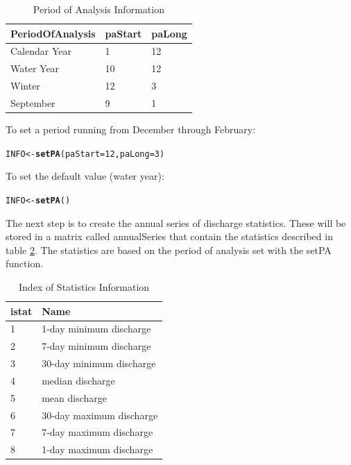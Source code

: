 \documentclass[a4paper,11pt]{article}\usepackage[]{graphicx}\usepackage[]{color}
\makeatletter
\newcommand{\hlnum}[1]{\textcolor[rgb]{0.686,0.059,0.569}{#1}}%
\newcommand{\hlstd}[1]{\textcolor[rgb]{0.345,0.345,0.345}{#1}}%
\newcommand{\hlkwb}[1]{\textcolor[rgb]{0.69,0.353,0.396}{#1}}%
\newcommand{\hlkwc}[1]{\textcolor[rgb]{0.333,0.667,0.333}{#1}}%
\newcommand{\hlkwd}[1]{\textcolor[rgb]{0.737,0.353,0.396}{\textbf{#1}}}%
\newenvironment{kframe}{%
 \def\at@end@of@kframe{}%
 \ifinner\ifhmode%
  \def\at@end@of@kframe{\end{minipage}}%
  \begin{minipage}{\columnwidth}%
 \fi\fi%
 \def\FrameCommand##1{\hskip\@totalleftmargin \hskip-\fboxsep
 \colorbox{shadecolor}{##1}\hskip-\fboxsep
     \hskip-\linewidth \hskip-\@totalleftmargin \hskip\columnwidth}%
 \MakeFramed {\advance\hsize-\width
   \@totalleftmargin\z@ \linewidth\hsize
   \@setminipage}}%
 {\par\unskip\endMakeFramed%
 \at@end@of@kframe}
\newenvironment{knitrout}{}{} %
\makeatother
\begin{document}
\begin{table}[!ht]
\centering
\caption{Period of Analysis Information} 
\label{table:paINFO}
\begin{tabular}{lll}
  \hline
PeriodOfAnalysis & paStart & paLong \\ 
  \hline
Calendar Year & 1 & 12 \\ 
  Water Year & 10 & 12 \\ 
  Winter & 12 & 3 \\ 
  September & 9 & 1 \\ 
   \hline
\end{tabular}
\end{table}

To set a period running from December through February:
\begin{knitrout}
\color{fgcolor}\begin{kframe}
\begin{alltt}
\hlstd{INFO} \hlkwb{<-} \hlkwd{setPA}\hlstd{(}\hlkwc{paStart}\hlstd{=}\hlnum{12}\hlstd{,}\hlkwc{paLong}\hlstd{=}\hlnum{3}\hlstd{)}
\end{alltt}
\end{kframe}
\end{knitrout}


To set the default value (water year):
\begin{knitrout}
\color{fgcolor}\begin{kframe}
\begin{alltt}
\hlstd{INFO} \hlkwb{<-} \hlkwd{setPA}\hlstd{()}
\end{alltt}
\end{kframe}
\end{knitrout}


The next step is to create the annual series of discharge statistics.  These will be stored in a matrix called annualSeries that contain the statistics described in table \ref{table:istat}. The statistics are based on the period of analysis set with the setPA function.

\begin{table}[!ht]
\centering
\caption{Index of Statistics Information} 
\label{table:istat}
\begin{tabular}{ll}
  \hline
istat & Name \\ 
  \hline
1 & 1-day minimum discharge \\ 
  2 & 7-day minimum discharge \\ 
  3 & 30-day minimum discharge \\ 
  4 & median discharge \\ 
  5 & mean discharge \\ 
  6 & 30-day maximum discharge \\ 
  7 & 7-day maximum discharge \\ 
  8 & 1-day maximum discharge \\ 
   \hline
\end{tabular}
\end{table}
\end{document}

